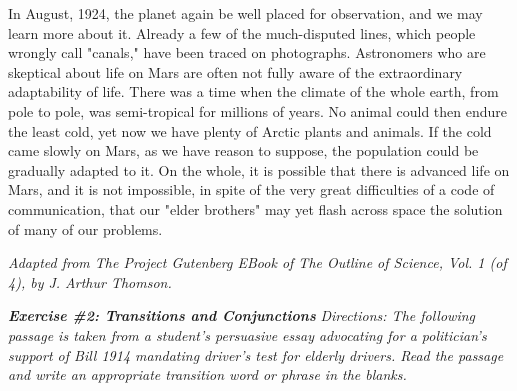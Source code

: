 \documentclass[12pt]{book}
\renewcommand{\indent}{\hspace{1cm}}
\begin{document}
\begin{spacing}{2}
\begin{linenumbers*}
\indent In August, 1924, the planet again be well placed for observation, and we may learn more about it. Already a few of the much-disputed lines, which people wrongly call "canals," have been traced on photographs. Astronomers who are skeptical about life on Mars are often not fully aware of the extraordinary adaptability of life. There was a time when the climate of the whole earth, from pole to pole, was semi-tropical for millions of years. No animal could then endure the least cold, yet now we have plenty of Arctic plants and animals. If the cold came slowly on Mars, as we have reason to suppose, the population could be gradually adapted to it. On the whole, it is possible that there is advanced life on Mars, and it is not impossible, in spite of the very great difficulties of a code of communication, that our "elder brothers" may yet flash across space the solution of many of our problems.
\end{linenumbers*}

\textit{Adapted from The Project Gutenberg EBook of The Outline of Science, Vol. 1 (of 4), by J. Arthur Thomson.}

\end{spacing}

\bigskip
\textbf{\textit{Exercise \#2: Transitions and Conjunctions}}
\bigskip
\textit{Directions: The following passage is taken from a student's persuasive essay advocating for a politician's support of Bill 1914 mandating driver's test for elderly drivers. Read the passage and write an appropriate transition word or phrase in the blanks.}
\end{document}

